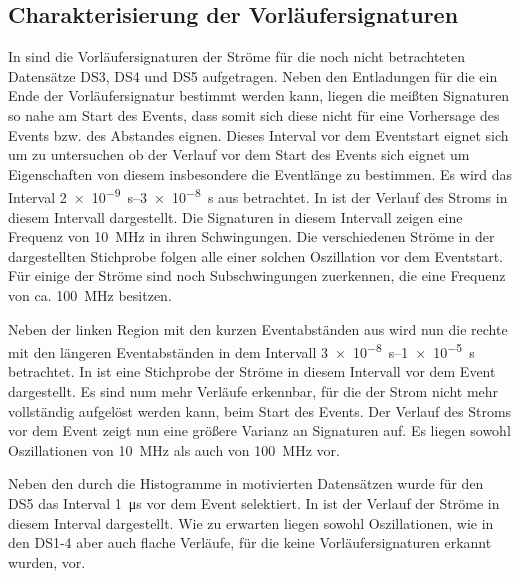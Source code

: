 \subsection{Charakterisierung der Vorläufersignaturen}
In  sind die Vorläufersignaturen der Ströme für die noch nicht betrachteten Datensätze DS3, DS4 und DS5 aufgetragen.
Neben den Entladungen für die ein Ende der Vorläufersignatur bestimmt werden kann, liegen die meißten Signaturen so nahe am Start des Events, dass somit sich diese nicht für eine Vorhersage des Events bzw. des Abstandes eignen. Dieses Interval vor dem Eventstart eignet sich um zu untersuchen ob der Verlauf vor dem Start des Events sich eignet um Eigenschaften von diesem insbesondere die Eventlänge zu bestimmen. Es wird das Interval \SIrange{2e-9}{3e-8}{\second} aus  betrachtet. In  ist der Verlauf des Stroms in diesem Intervall dargestellt. Die Signaturen in diesem Intervall zeigen eine Frequenz von \SI{10}{\mega\hertz} in ihren Schwingungen. Die verschiedenen Ströme in der dargestellten Stichprobe folgen alle einer solchen Oszillation vor dem Eventstart. Für einige der Ströme sind noch Subschwingungen zuerkennen, die eine Frequenz von ca. \SI{100}{\mega\hertz} besitzen.  

Neben der linken Region mit den kurzen Eventabständen aus  wird nun die rechte mit den längeren Eventabständen in dem Intervall \SIrange{3e-8}{1e-5}{\second} betrachtet. In  ist eine Stichprobe der Ströme in diesem Intervall vor dem Event dargestellt. Es sind num mehr Verläufe erkennbar, für die der Strom nicht mehr vollständig aufgelöst werden kann, beim Start des Events. Der Verlauf des Stroms vor dem Event zeigt nun eine größere Varianz an Signaturen auf. Es liegen sowohl Oszillationen von \SI{10}{\mega\hertz} als auch von \SI{100}{\mega\hertz} vor. 

Neben den durch die Histogramme in  motivierten Datensätzen wurde für den DS5 das Interval \SI{1}{\micro\second} vor dem Event selektiert. In  ist der Verlauf der Ströme in diesem Interval dargestellt. Wie zu erwarten liegen sowohl Oszillationen, wie in den DS1-4 aber auch flache Verläufe, für die keine Vorläufersignaturen erkannt wurden, vor. 


